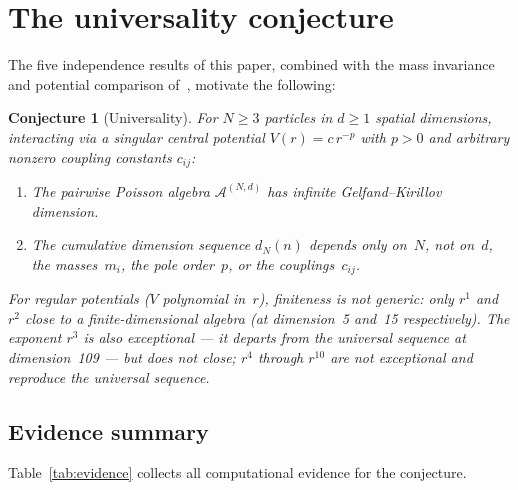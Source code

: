 \documentclass[11pt,a4paper]{article}
\newtheorem{conjecture}[theorem]{Conjecture}
\theoremstyle{remark}
\newcommand{\cA}{\mathcal{A}}
\begin{document}
\section{The universality conjecture}
\label{sec:conjecture}

The five independence results of this paper, combined
with the mass invariance and potential comparison
of~\cite{paper1}, motivate the following:

\begin{conjecture}[Universality]
\label{conj:universal}
For $N \ge 3$ particles in $d \ge 1$ spatial dimensions,
interacting via a singular central potential
$V(r) = c\, r^{-p}$ with $p > 0$ and arbitrary nonzero
coupling constants $c_{ij}$:
\begin{enumerate}[nosep]
  \item The pairwise Poisson algebra $\cA^{(N,d)}$ has
    infinite Gelfand--Kirillov dimension.
  \item The cumulative dimension sequence $d_N(n)$
    depends only on~$N$, not on~$d$, the masses~$m_i$,
    the pole order~$p$, or the couplings~$c_{ij}$.
\end{enumerate}
For regular potentials ($V$ polynomial in~$r$), finiteness
is not generic: only $r^1$ and $r^2$ close to a
finite-dimensional algebra (at dimension~5 and~15
respectively).  The exponent $r^3$ is also exceptional ---
it departs from the universal sequence at dimension~109 ---
but does not close; $r^4$ through $r^{10}$ are not
exceptional and reproduce the universal sequence.
\end{conjecture}

\subsection{Evidence summary}

Table~\ref{tab:evidence} collects all computational
evidence for the conjecture.
\end{document}
